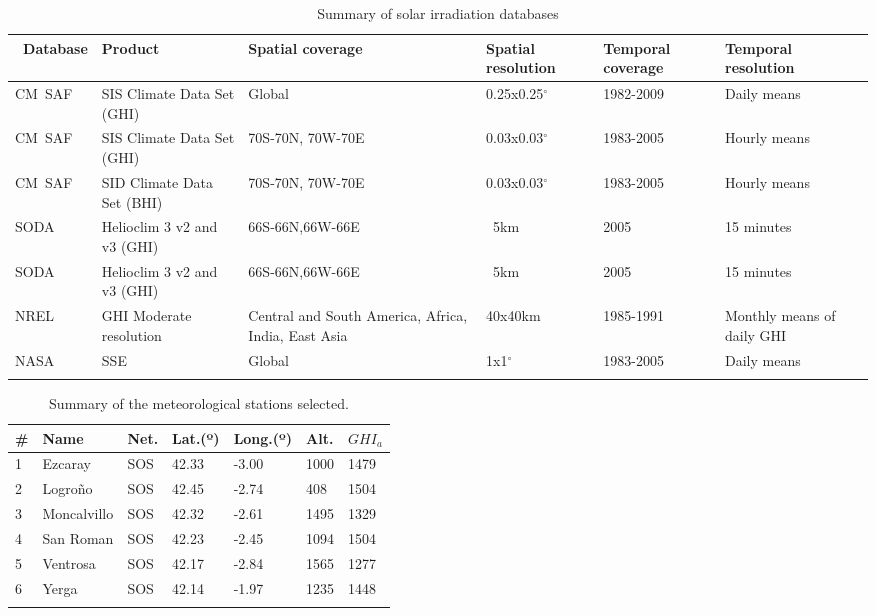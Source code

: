 \documentclass[authoryear, sort&compress]{elsarticle}
\begin{document}
\begin{small}
\begin{longtable}{p{}p{}p{}p{}p{}p{}}
\toprule
\ Database&Product&Spatial coverage&Spatial resolution&Temporal coverage&Temporal resolution \\
\midrule
\endhead
CM~SAF&SIS Climate Data Set (GHI)&Global&0.25x0.25$^\circ$&1982-2009&Daily means\\
\midrule
CM~SAF&SIS Climate Data Set (GHI)&70S-70N, 70W-70E&0.03x0.03$^\circ$&1983-2005&Hourly means\\
\midrule
CM~SAF&SID Climate Data Set (BHI)&70S-70N, 70W-70E&0.03x0.03$^\circ$&1983-2005&Hourly means\\
\midrule
SODA& Helioclim 3 v2 and v3 (GHI)&66S-66N,66W-66E&~5km&2005&15 minutes\\
\midrule
SODA& Helioclim 3 v2 and v3 (GHI)&66S-66N,66W-66E&~5km&2005&15 minutes\\
\midrule
NREL& GHI Moderate resolution&Central and South America, Africa, India, East Asia&40x40km&1985-1991&Monthly means of daily GHI\\
\midrule
NASA& SSE&Global&1x1$^\circ$&1983-2005&Daily means\\
\bottomrule
\caption{Summary of solar irradiation databases}
\label{tab:databases}
\end{longtable}
\end{small}


\begin{small}
\begin{longtable}{p{}p{}p{}p{}p{}p{}p{}}
\toprule
\# & Name & Net. & Lat.(º) & Long.(º) & Alt. & $GHI_{a}$\\
\midrule
\endhead
1 & Ezcaray & SOS & 42.33 & -3.00 & 1000 & 1479\\
\midrule
2 & Logroño & SOS & 42.45 & -2.74 & 408 & 1504\\
\midrule 
3 & Moncalvillo & SOS & 42.32 & -2.61 & 1495 & 1329 \\
\midrule
4 & San Roman & SOS & 42.23 & -2.45 & 1094 & 1504 \\
\midrule
5 & Ventrosa & SOS & 42.17 & -2.84 & 1565 & 1277\\
\midrule
6 & Yerga & SOS& 42.14 & -1.97 & 1235 &1448\\
\bottomrule
\caption{Summary of the meteorological
stations selected.}
\label{tab:stations}
\end{longtable}
\end{small}
\end{document}
